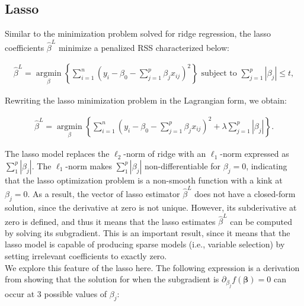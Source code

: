 \subsection{Lasso}
\label{section:lasso}
\noindent Similar to the minimization problem solved for ridge regression, the lasso coefficients $\hat{\beta}^{L}$ minimize a penalized RSS characterized below:

\begin{align}
\label{eqn:eqn7}
\hat{\beta}^{L} = \underset{\beta}{\operatorname{argmin}}\left\{\sum_{i=1}^{n}\left(y_{i}-\beta_{0}-\sum_{j=1}^{p} \beta_{j} x_{i j}\right)^{2}\right\} \text { subject to } \sum_{j=1}^{p}\left|\beta_{j}\right| \leq t,
\end{align}



\noindent Rewriting the lasso minimization problem in the Lagrangian form, we obtain:

\begin{align}
\label{eqn:eqlasso}
\hat{\beta}^{L} = \underset{\beta}{\operatorname{argmin}}\left\{\sum_{i=1}^{n}\left(y_{i}-\beta_{0}-\sum_{j=1}^{p} \beta_{j}  x_{i j}\right)^{2}+\lambda \sum_{j=1}^{p}\left|\beta_{j}\right|\right\}.
\end{align}


\noindent The lasso model replaces the $\ell_2$-norm of ridge with an $\ell_1$-norm expressed as $\sum_{1}^{p}\left|\beta_{j}\right|$. The $\ell_1$-norm makes $\sum_{1}^{p}\left|\beta_{j}\right|$ non-differentiable for ${\beta}_j=0$, indicating that the lasso optimization problem is a non-smooth function with a kink at ${\beta}_j=0$. As a result, the vector of lasso estimator $\hat{\beta}^{L}$ does not have a closed-form solution, since the derivative at zero is not unique. However, its subderivative at zero is defined, and thus it means that the lasso estimates $\hat{\beta}^{L}$ can be computed by solving its subgradient. This is an important result, since it means that the lasso model is capable of producing sparse models (i.e., variable selection) by setting irrelevant coefficients to exactly zero.\\

\noindent We explore this feature of the lasso here. The following expression is a derivation from \cite{murphy2012machine} showing that the solution for when the subgradient is $\partial_{\beta_{j}} f(\mathbf{\beta})=0$ can occur at 3 possible values of $\beta_j$: 

